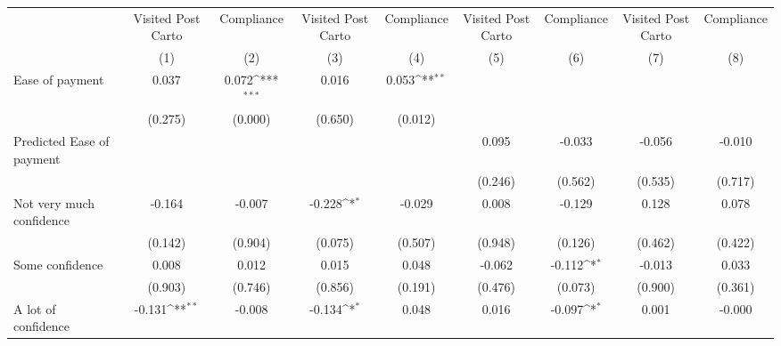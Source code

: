{
\def\sym#1{\ifmmode^{#1}\else\(^{#1}\)\fi}
\begin{tabular}{l*{8}{c}}
\hline\hline
                &\multicolumn{1}{c}{Visited Post Carto}&\multicolumn{1}{c}{Compliance}&\multicolumn{1}{c}{Visited Post Carto}&\multicolumn{1}{c}{Compliance}&\multicolumn{1}{c}{Visited Post Carto}&\multicolumn{1}{c}{Compliance}&\multicolumn{1}{c}{Visited Post Carto}&\multicolumn{1}{c}{Compliance}\\
                &\multicolumn{1}{c}{(1)}         &\multicolumn{1}{c}{(2)}         &\multicolumn{1}{c}{(3)}         &\multicolumn{1}{c}{(4)}         &\multicolumn{1}{c}{(5)}         &\multicolumn{1}{c}{(6)}         &\multicolumn{1}{c}{(7)}         &\multicolumn{1}{c}{(8)}         \\
\hline
Ease of payment &    0.037         &    0.072\sym{***}&    0.016         &    0.053\sym{**} &                  &                  &                  &                  \\
                &  (0.275)         &  (0.000)         &  (0.650)         &  (0.012)         &                  &                  &                  &                  \\
Predicted Ease of payment&                  &                  &                  &                  &    0.095         &   -0.033         &   -0.056         &   -0.010         \\
                &                  &                  &                  &                  &  (0.246)         &  (0.562)         &  (0.535)         &  (0.717)         \\
Not very much confidence&   -0.164         &   -0.007         &   -0.228\sym{*}  &   -0.029         &    0.008         &   -0.129         &    0.128         &    0.078         \\
                &  (0.142)         &  (0.904)         &  (0.075)         &  (0.507)         &  (0.948)         &  (0.126)         &  (0.462)         &  (0.422)         \\
Some confidence &    0.008         &    0.012         &    0.015         &    0.048         &   -0.062         &   -0.112\sym{*}  &   -0.013         &    0.033         \\
                &  (0.903)         &  (0.746)         &  (0.856)         &  (0.191)         &  (0.476)         &  (0.073)         &  (0.900)         &  (0.361)         \\
A lot of confidence&   -0.131\sym{**} &   -0.008         &   -0.134\sym{*}  &    0.048         &    0.016         &   -0.097\sym{*}  &    0.001         &   -0.000         \\

\end{tabular}}
